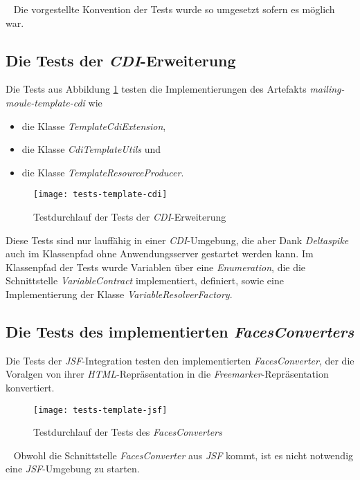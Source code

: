 \ \newline
Die vorgestellte Konvention der Tests wurde so umgesetzt sofern es möglich war. 

\subsection{Die Tests der \emph{CDI}-Erweiterung}
Die Tests aus Abbildung \ref{fig:tests-template-cdi} testen die Implementierungen des Artefakts \emph{mailing-moule-template-cdi} wie
\begin{itemize}
	\item die Klasse \emph{TemplateCdiExtension},
	\item die Klasse \emph{CdiTemplateUtils} und
	\item die Klasse \emph{TemplateResourceProducer}.
\end{itemize}
\begin{figure}[h]
\centering
\texttt{[image: tests-template-cdi]}
\caption{Testdurchlauf der Tests der \emph{CDI}-Erweiterung}
\label{fig:tests-template-cdi}
\end{figure}
Diese Tests sind nur lauffähig in einer \emph{CDI}-Umgebung, die aber Dank \emph{Deltaspike} auch im Klassenpfad ohne Anwendungsserver gestartet werden kann. Im Klassenpfad der Tests wurde Variablen über eine \emph{Enumeration}, die die Schnittstelle \emph{VariableContract} implementiert, definiert, sowie eine Implementierung der Klasse \emph{VariableResolverFactory}.

\subsection{Die Tests des implementierten \emph{FacesConverters}}
Die Tests der \emph{JSF}-Integration testen den implementierten \emph{FacesConverter}, der die Voralgen von ihrer \emph{HTML}-Repräsentation in die \emph{Freemarker}-Repräsentation konvertiert.
\begin{figure}[h]
\centering
\texttt{[image: tests-template-jsf]}
\caption{Testdurchlauf der Tests des \emph{FacesConverters}}
\label{fig:tests-template-jsf}
\end{figure}
\ \newline
Obwohl die Schnittstelle \emph{FacesConverter} aus \emph{JSF} kommt, ist es nicht notwendig eine \emph{JSF}-Umgebung zu starten.

